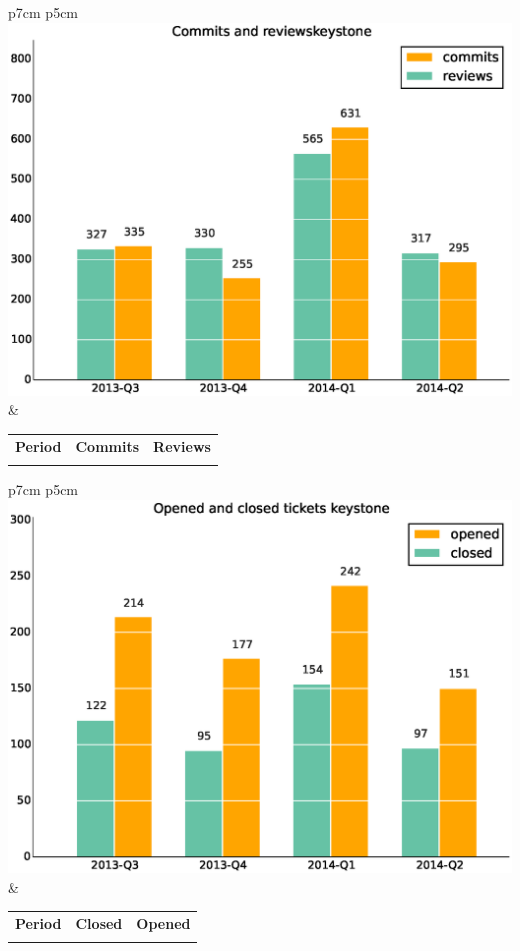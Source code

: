 \documentclass[a4wide,11pt]{report}
\begin{document}
\begin{tabular}{p{7cm} p{5cm}}
    \vspace{0pt} 
    \includegraphics[scale=.35]{figs/commitskeystone.eps}
    & 
    \vspace{0pt}
    \begin{tabular}{l|r|r|}%
    \bfseries Period & \bfseries Commits & \bfseries Reviews %
    \csvreader[head to column names]{data/commitskeystone.csv}{}%
    {\\ & \commits & \submitted}
    \end{tabular}
\end{tabular}

\begin{tabular}{p{7cm} p{5cm}}
    \vspace{0pt} 
    \includegraphics[scale=.35]{figs/closedkeystone.eps}
    & 
    \vspace{0pt}
    \begin{tabular}{l|r|r|}%
\bfseries Period & \bfseries Closed & \bfseries Opened
    \csvreader[head to column names]{data/closedkeystone.csv}{}%
    {\\ & \closed & \opened}
    \end{tabular}
\end{tabular}
\end{document}
